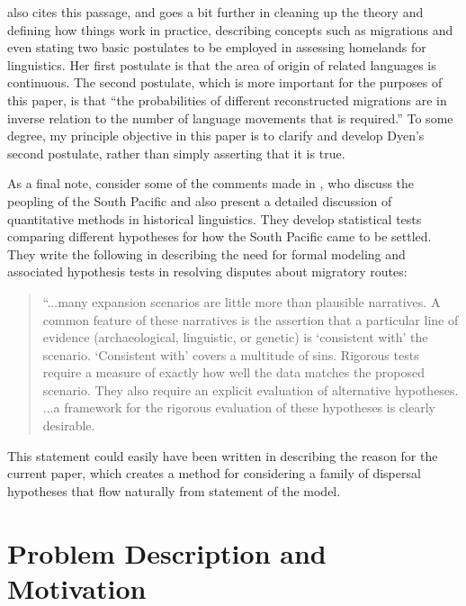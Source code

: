 \documentclass[11pt]{article}
\begin{document}
\citet[p. 623]{dyen56} also cites this passage, and goes a bit further in cleaning up the theory and defining how things work in practice, describing concepts such as migrations and even stating two basic postulates to be employed in assessing homelands for linguistics. Her first postulate is that the area of origin of related languages is continuous. The second postulate, which is more important for the purposes of this paper, is that ``the probabilities of different reconstructed migrations are in inverse relation to the number of language movements that is required.'' \citep[p.613]{dyen56} 
To some degree, my principle objective in this paper is to clarify and develop Dyen's second postulate, rather than simply asserting that it is true.

As a final note, consider some of the comments made in \cite{greenhill05}, who discuss the peopling of the South Pacific and also present a detailed discussion of quantitative methods in historical linguistics. They develop statistical tests comparing different hypotheses for how the South Pacific came to be settled. They write the following in describing the need for formal modeling and associated hypothesis tests in resolving disputes about migratory routes:

\begin{quote}
``...many expansion scenarios are little more than plausible narratives. A common feature of these narratives is the assertion that a particular line of evidence (archaeological, linguistic, or genetic) is `consistent with' the scenario. `Consistent with' covers a multitude of sins. Rigorous tests require a measure of exactly how well the data matches the proposed scenario. They also require an explicit evaluation of alternative hypotheses. ...a framework for the rigorous evaluation of these hypotheses is clearly desirable. \citep[p. 31]{greenhill05} 
\end{quote}
This statement could easily have been written in describing the reason for the current paper, which creates a method for considering a family of dispersal hypotheses that flow naturally from statement of the model.

 


\section{Problem Description and Motivation}
\end{document}
